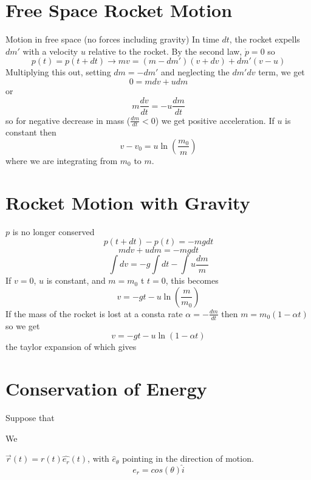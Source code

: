 \documentclass{homework}
\begin{document}
\section{Free Space Rocket Motion}
Motion in free space (no forces including gravity)
In time $dt$, the rocket expells $dm'$ with a velocity $u$ relative to the rocket. By the second law, $\dot p = 0$ so 
\[p(t) = p(t + dt) \rightarrow mv = (m - dm')(v + dv) + dm'(v - u)\]
Multiplying this out, setting $dm = -dm'$ and neglecting the $dm'dv$ term, we get
\[0 = mdv + udm\]
or
\[m\frac{dv}{dt} = -u\frac{dm}{dt}\]
so for negative decrease in mass ($\frac{dm}{dt} <0$) we get positive acceleration. If $u$ is constant then 
\[v - v_0 = u\ln \left( \frac{m_0}{m} \right)\]
where we are integrating from $m_0$ to $m$. 

\section{Rocket Motion with Gravity}
$p$ is no longer conserved
\[p(t + dt) - p(t) = -mgdt\]
\[mdv + udm = -mgdt\]
\[\int dv = -g\int dt - \int u \frac{dm}{m}\]
If $v = 0$, $u$ is constant, and $m = m_0$ t $t = 0$, this becomes 
\[v = -gt -u\ln \left(\frac{m}{m_0} \right) \]
If the mass of the rocket is lost at a consta rate $\alpha = - \frac{dm}{dt}$ then $m = m_0(1 - \alpha t)$ so we get
\[v = -gt -u\ln(1 - \alpha t) \]
the taylor expansion of which gives
\[\]





\section{Conservation of Energy}




Suppose that 



We 





$\vec{r}(t) = r(t)\hat{e_r}(t)$, with $\hat e_{\theta}$ pointing in the direction of motion.
\[e_r = cos(\theta)\hat i\]
\end{document}
